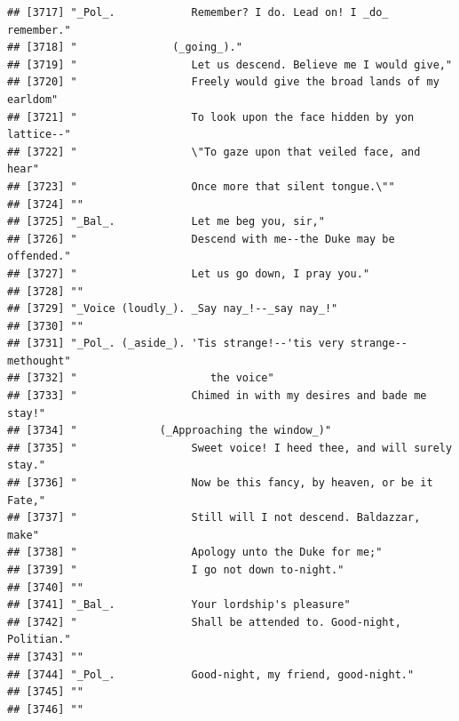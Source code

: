 \documentclass{article}\usepackage[]{graphicx}\usepackage[]{color}
\makeatletter
\newenvironment{kframe}{%
 \def\at@end@of@kframe{}%
 \ifinner\ifhmode%
  \def\at@end@of@kframe{\end{minipage}}%
  \begin{minipage}{\columnwidth}%
 \fi\fi%
 \def\FrameCommand##1{\hskip\@totalleftmargin \hskip-\fboxsep
 \colorbox{shadecolor}{##1}\hskip-\fboxsep
     \hskip-\linewidth \hskip-\@totalleftmargin \hskip\columnwidth}%
 \MakeFramed {\advance\hsize-\width
   \@totalleftmargin\z@ \linewidth\hsize
   \@setminipage}}%
 {\par\unskip\endMakeFramed%
 \at@end@of@kframe}
\newenvironment{knitrout}{}{} %
\makeatother
\begin{document}
\begin{knitrout}
\begin{kframe}
\begin{verbatim}
## [3717] "_Pol_.            Remember? I do. Lead on! I _do_ remember."                 
## [3718] "               (_going_)."                                                   
## [3719] "                  Let us descend. Believe me I would give,"                  
## [3720] "                  Freely would give the broad lands of my earldom"           
## [3721] "                  To look upon the face hidden by yon lattice--"             
## [3722] "                  \"To gaze upon that veiled face, and hear"                 
## [3723] "                  Once more that silent tongue.\""                           
## [3724] ""                                                                            
## [3725] "_Bal_.            Let me beg you, sir,"                                      
## [3726] "                  Descend with me--the Duke may be offended."                
## [3727] "                  Let us go down, I pray you."                               
## [3728] ""                                                                            
## [3729] "_Voice (loudly_). _Say nay_!--_say nay_!"                                    
## [3730] ""                                                                            
## [3731] "_Pol_. (_aside_). 'Tis strange!--'tis very strange--methought"               
## [3732] "                     the voice"                                              
## [3733] "                  Chimed in with my desires and bade me stay!"               
## [3734] "             (_Approaching the window_)"                                     
## [3735] "                  Sweet voice! I heed thee, and will surely stay."           
## [3736] "                  Now be this fancy, by heaven, or be it Fate,"              
## [3737] "                  Still will I not descend. Baldazzar, make"                 
## [3738] "                  Apology unto the Duke for me;"                             
## [3739] "                  I go not down to-night."                                   
## [3740] ""                                                                            
## [3741] "_Bal_.            Your lordship's pleasure"                                  
## [3742] "                  Shall be attended to. Good-night, Politian."               
## [3743] ""                                                                            
## [3744] "_Pol_.            Good-night, my friend, good-night."                        
## [3745] ""                                                                            
## [3746] ""                                                                            

\end{verbatim}
\end{kframe}
\end{knitrout}
\end{document}
